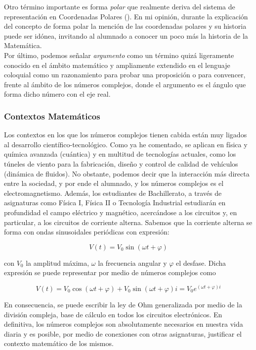 \documentclass[../main.tex]{memoir}
\begin{document}
Otro término importante es forma \textit{polar} que realmente deriva del sistema de representación en Coordenadas Polares (\cite{adams2013}). En mi opinión, durante la explicación del concepto de forma polar la mención de las coordenadas polares y su historia puede ser idónea, invitando al alumnado a conocer un poco más la historia de la Matemática. \\

Por último, podemos señalar \textit{argumento} como un término quizá ligeramente conocido en el ámbito matemático y ampliamente extendido en el lenguaje coloquial como un razonamiento para probar una proposición o para convencer, frente al ámbito de los números complejos, donde el argumento es el ángulo que forma dicho número con el eje real.

\subsubsection{Contextos Matemáticos}

Los contextos en los que los números complejos tienen cabida están muy ligados al desarrollo científico-tecnológico. Como ya he comentado, se aplican en física y química avanzada (cuántica) y en multitud de tecnologías actuales, como los túneles de viento para la fabricación, diseño y control de calidad de vehículos (dinámica de fluidos). No obstante, podemos decir que la interacción más directa entre la sociedad, y por ende el alumnado, y los números complejos es el electromagnetismo. Además, los estudiantes de Bachillerato, a través de asignaturas como Física I, Física II o Tecnología Industrial estudiarán en profundidad el campo eléctrico y magnético, acercándose a los circuitos y, en particular, a los circuitos de corriente alterna. Sabemos que la corriente alterna se forma con ondas sinusoidales periódicas con expresión:

$$V(t) = V_0  \sin(\omega t + \varphi)$$

con $V_0$ la amplitud máxima, $\omega$ la frecuencia angular y $\varphi$ el desfase. Dicha expresión se puede representar por medio de números complejos como

$$V(t) = V_0 \cos(\omega t +\varphi) + V_0 \sin(\omega t + \varphi) i = V_0 e^{(\omega t + \varphi)i}$$

En consecuencia, se puede escribir la ley de Ohm generalizada por medio de la división compleja, base de cálculo en todos los circuitos electrónicos. En definitiva, los números complejos son absolutamente necesarios en nuestra vida diaria y es posible, por medio de conexiones con otras asignaturas, justificar el contexto matemático de los mismos.
\end{document}

